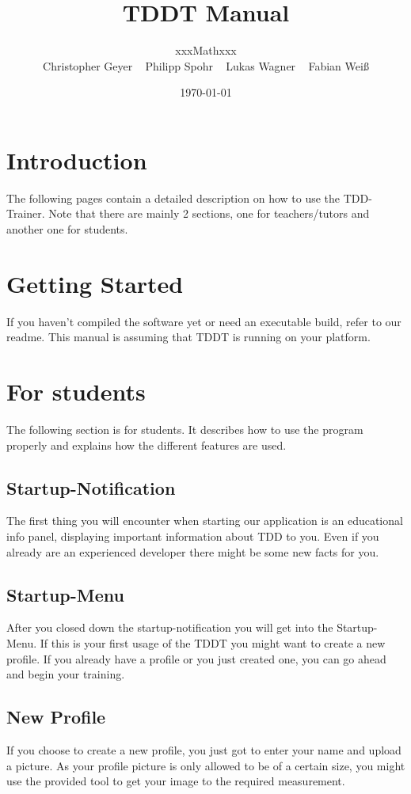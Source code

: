 \documentclass[10pt,a4paper]{article}
\begin{document}
\title{\large TDDT Manual}
\date{\small \today}
\author{\normalsize xxxMathxxx \\
Christopher Geyer ~
Philipp Spohr ~
Lukas Wagner ~
Fabian Weiß }
\maketitle
\tableofcontents
\section{Introduction}
The following pages contain a detailed description on how to use the TDD-Trainer.
Note that there are mainly 2 sections, one for teachers/tutors and another one for students.
\section{Getting Started}
If you haven't compiled the software yet or need an executable build, refer to our readme. This manual is assuming that TDDT is running on your platform.
\section{For students}
The following section is for students. It describes how to use the program properly and explains how the different features are used.
\subsection{Startup-Notification}
The first thing you will encounter when starting our application is an educational info panel, displaying important information about TDD to you. Even if you already are an experienced developer there might be some new facts for you.
\subsection{Startup-Menu}
After you closed down the startup-notification you will get into the Startup-Menu. If this is your first usage of the TDDT you might want to create a new profile. If you already have a profile or you just created one, you can go ahead and begin your training.
\subsection{New Profile}
If you choose to create a new profile, you just got to enter your name and upload a picture. As your profile picture is only allowed to be of a certain size, you might use the provided tool to get your image to the required measurement.
\end{document}
